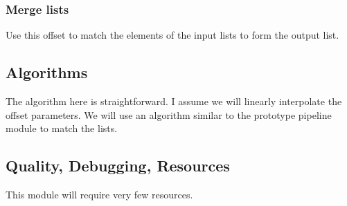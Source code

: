 \subsubsection{Merge lists}

Use this offset to match the elements of the input lists to form the
output list.

\subsection{Algorithms}

The algorithm here is straightforward.  I assume we will linearly interpolate
the offset parameters.
We will use an algorithm similar to the prototype pipeline module to match
the lists.

\subsection{Quality, Debugging, Resources}

This module will require very few resources.
